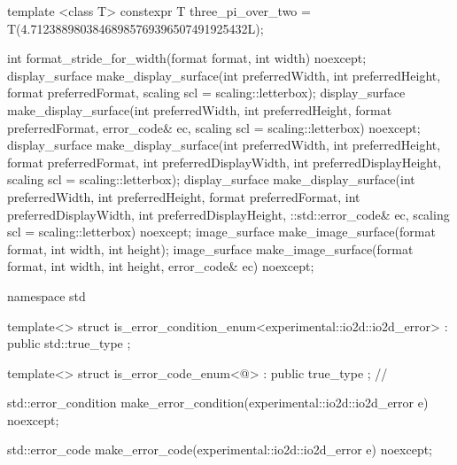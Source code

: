 \begin{codeblock}
{{{{  template <class T>
  constexpr T three_pi_over_two = T(4.71238898038468985769396507491925432L);
  
  int format_stride_for_width(format format, int width) noexcept;
  display_surface make_display_surface(int preferredWidth,
    int preferredHeight, format preferredFormat,
    scaling scl = scaling::letterbox);
  display_surface make_display_surface(int preferredWidth,
    int preferredHeight, format preferredFormat, error_code& ec,
    scaling scl = scaling::letterbox) noexcept;
  display_surface make_display_surface(int preferredWidth,
    int preferredHeight, format preferredFormat, int preferredDisplayWidth, 
    int preferredDisplayHeight, scaling scl = scaling::letterbox);
  display_surface make_display_surface(int preferredWidth,
    int preferredHeight, format preferredFormat, int preferredDisplayWidth, 
    int preferredDisplayHeight, ::std::error_code& ec,
    scaling scl = scaling::letterbox) noexcept;
  image_surface make_image_surface(format format, int width, int height);
  image_surface make_image_surface(format format, int width, int height, 
    error_code& ec) noexcept;
} } } }

namespace std {
  template<>
  struct is_error_condition_enum<experimental::io2d::io2d_error>
    : public std::true_type{ };

  template<>
  struct is_error_code_enum<@\impdef@>
    : public true_type{ }; // \expos

  std::error_condition make_error_condition(experimental::io2d::io2d_error e) 
    noexcept;

  std::error_code make_error_code(experimental::io2d::io2d_error e) noexcept;
}

\end{codeblock}
%
